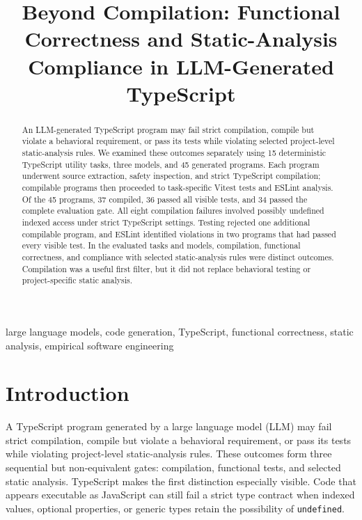 \documentclass[conference]{IEEEtran}
\begin{document}
\title{Beyond Compilation: Functional Correctness and Static-Analysis Compliance in LLM-Generated TypeScript}

\author{
}

\maketitle

\begin{abstract}
An LLM-generated TypeScript program may fail strict compilation, compile but violate a behavioral requirement, or pass its tests while violating selected project-level static-analysis rules. We examined these outcomes separately using 15 deterministic TypeScript utility tasks, three models, and 45 generated programs. Each program underwent source extraction, safety inspection, and strict TypeScript compilation; compilable programs then proceeded to task-specific Vitest tests and ESLint analysis. Of the 45 programs, 37 compiled, 36 passed all visible tests, and 34 passed the complete evaluation gate. All eight compilation failures involved possibly undefined indexed access under strict TypeScript settings. Testing rejected one additional compilable program, and ESLint identified violations in two programs that had passed every visible test. In the evaluated tasks and models, compilation, functional correctness, and compliance with selected static-analysis rules were distinct outcomes. Compilation was a useful first filter, but it did not replace behavioral testing or project-specific static analysis.
\end{abstract}

\begin{IEEEkeywords}
large language models, code generation, TypeScript, functional correctness, static analysis, empirical software engineering
\end{IEEEkeywords}

\section{Introduction}
A TypeScript program generated by a large language model (LLM) may fail strict compilation, compile but violate a behavioral requirement, or pass its tests while violating project-level static-analysis rules. These outcomes form three sequential but non-equivalent gates: compilation, functional tests, and selected static analysis. TypeScript makes the first distinction especially visible. Code that appears executable as JavaScript can still fail a strict type contract when indexed values, optional properties, or generic types retain the possibility of \texttt{undefined}.
\end{document}
